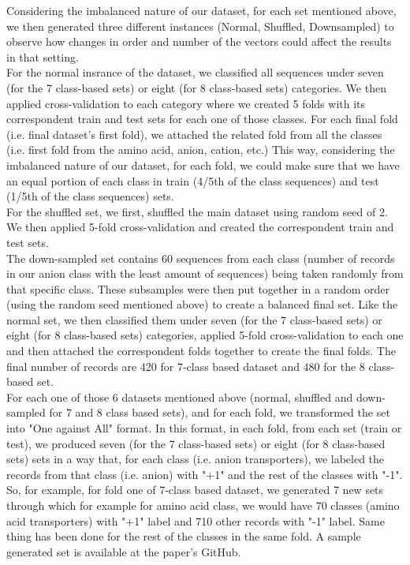     Considering the imbalanced nature of our dataset, for each set mentioned above, we then generated 
    three different instances (Normal, Shuffled, Downsampled) to observe how changes in order 
    and number of the vectors could affect the results in that setting.\\

    For the normal insrance of the dataset, we classified all sequences under seven (for the 7 class-based sets) or 
    eight (for 8 class-based sets) categories. We then applied cross-validation to each category where we created 
    5 folds with its correspondent train and test sets for each one of those classes. For each final fold 
    (i.e. final dataset's first fold), we attached the related fold from all the classes (i.e. first fold from 
    the amino acid, anion, cation, etc.) This way, considering the imbalanced nature of our dataset, for each fold, 
    we could make sure that we have an equal portion of each class in train (4/5th of the class sequences) and test 
    (1/5th of the class sequences) sets.\\

    For the shuffled set, we first, shuffled the main dataset using random seed of 2. 
    We then applied 5-fold cross-validation and created the correspondent train and test sets.\\

    The down-sampled set contains 60 sequences from each class (number of records in our anion class with 
    the least amount of sequences) being taken randomly from that specific class. These subsamples were then put together in 
    a random order (using the random seed mentioned above) to create a balanced final set. Like the normal set, we then 
    classified them under seven (for the 7 class-based sets) or eight (for 8 class-based sets) categories, applied 
    5-fold cross-validation to each one and then attached the correspondent folds together to create the final folds.
    The final number of records are 420 for 7-class based dataset and 480 for the 8 class-based set.\\

    For each one of those 6 datasets mentioned above (normal, shuffled and down-sampled for 7 and 8 class based sets), 
    and for each fold, we transformed the set into "One against All" format. In this format, in each fold, 
    from each set (train or test), we produced seven (for the 7 class-based sets) or eight (for 8 class-based sets) 
    sets in a way that, for each class (i.e. anion transporters), we labeled the records from that class (i.e. anion) 
    with "+1" and the rest of the classes with "-1". So, for example, for fold one of 7-class based dataset, 
    we generated 7 new sets through which for example for amino acid class, we would have 70 classes 
    (amino acid transporters) with "+1" label and 710 other records with "-1" label. 
    Same thing has been done for the rest of the classes in the same fold. 
    A sample generated set is available at the paper’s GitHub. \\

